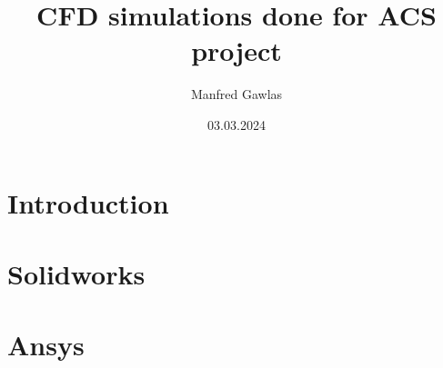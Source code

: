 \documentclass{report}
\title{CFD simulations done for ACS project}
\author{Manfred Gawlas}
\date{03.03.2024}
\begin{document}
\maketitle

\tableofcontents

\chapter{Introduction}


\chapter{Solidworks}


\chapter{Ansys}

\end{document}

